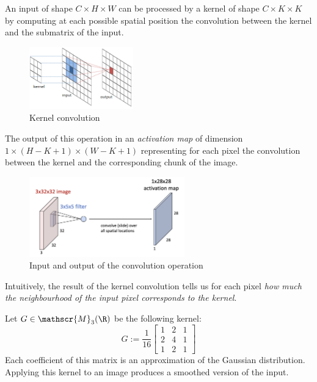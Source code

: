 \begin{definition}
    An input of shape $C\times H\times W$ can be processed by a kernel of shape $C\times K\times K$ by computing at each possible spatial position the convolution between the kernel and the submatrix of the input. 
    \begin{figure}[H]
        \centering
        \includegraphics[width=0.4\textwidth]{images/convolution-simple.png}
        \caption{Kernel convolution}
    \end{figure}
    
    The output of this operation in an \emph{activation map} of dimension $1\times (H - K + 1) \times (W - K + 1)$ representing for each pixel the convolution between the kernel and the corresponding chunk of the image.
    \begin{figure}[H]
        \centering
        \includegraphics[width=0.6\textwidth]{images/convolutional-map.png}
        \caption{Input and output of the convolution operation}
        \label{fig:one-kernel-layer}
    \end{figure}
\end{definition}

Intuitively, the result of the kernel convolution tells us for each pixel \emph{how much the neighbourhood of the input pixel corresponds to the kernel}.

\begin{example}
    Let $G\in\mathscr{M}_{3}(\R)$ be the following kernel:
    \begin{equation*}
        G := \frac{1}{16}\begin{bmatrix}
            1 & 2 & 1\\
            2 & 4 & 1\\
            1 & 2 & 1
        \end{bmatrix}
    \end{equation*}
    Each coefficient of this matrix is an approximation of the Gaussian distribution. Applying this kernel to an image produces a smoothed version of the input.
\end{example}

